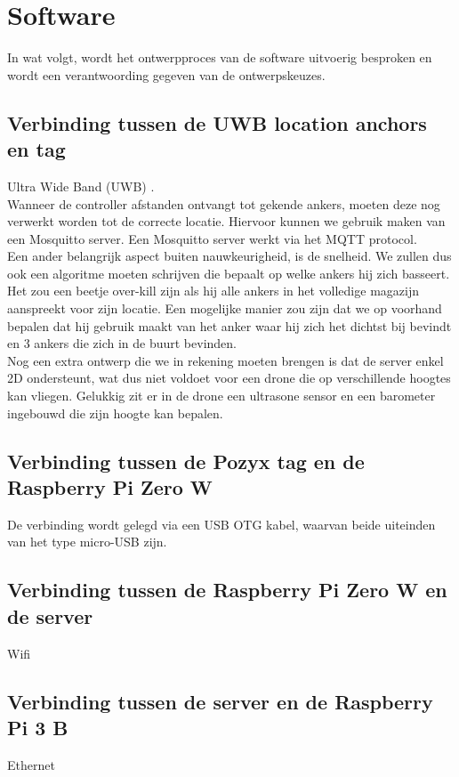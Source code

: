 \chapter{Software}
In wat volgt, wordt het ontwerpproces van de software uitvoerig besproken en wordt een verantwoording gegeven van de ontwerpskeuzes.

\section{Verbinding tussen de UWB location anchors en tag} \label{sec:uwb_tag}
Ultra Wide Band (UWB) \cite{uwb2016}.\\

Wanneer de controller afstanden ontvangt tot gekende ankers, moeten deze nog verwerkt worden tot de correcte locatie. Hiervoor kunnen we gebruik maken van een Mosquitto server. Een Mosquitto server werkt via het MQTT protocol.\\

Een ander belangrijk aspect buiten nauwkeurigheid, is de snelheid. We zullen dus ook een algoritme moeten schrijven die bepaalt op welke ankers hij zich basseert. Het zou een beetje over-kill zijn als hij alle ankers in het volledige magazijn aanspreekt voor zijn locatie. Een mogelijke manier zou zijn dat we op voorhand bepalen dat hij gebruik maakt van het anker waar hij zich het dichtst bij bevindt en 3 ankers die zich in de buurt bevinden.\\

Nog een extra ontwerp die we in rekening moeten brengen is dat de server enkel 2D ondersteunt, wat dus niet voldoet voor een drone die op verschillende hoogtes kan vliegen. Gelukkig zit er in de drone een ultrasone sensor en een barometer ingebouwd die zijn hoogte kan bepalen.

\section{Verbinding tussen de Pozyx tag en de Raspberry Pi Zero W} \label{sec:pozyx_raspberry}
De verbinding wordt gelegd via een USB OTG kabel, waarvan beide uiteinden van het type micro-USB zijn.

\section{Verbinding tussen de Raspberry Pi Zero W en de server} \label{sec:raspberry_server}
Wifi

\section{Verbinding tussen de server en de Raspberry Pi 3 B} \label{sec:server_raspberry}
Ethernet

